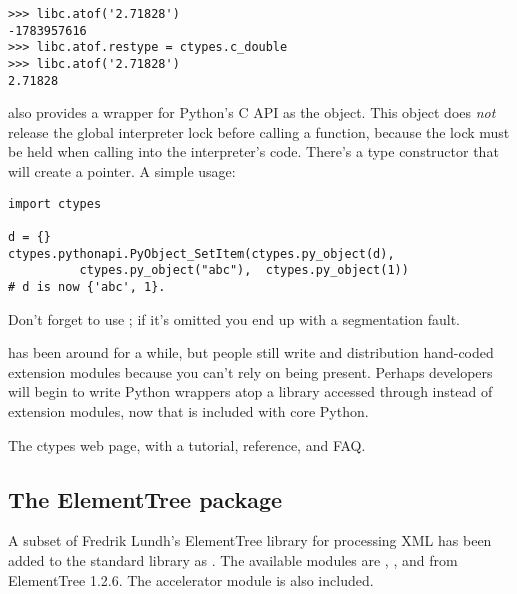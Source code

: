 \documentclass{howto}
\begin{document}
\begin{verbatim}
>>> libc.atof('2.71828')
-1783957616
>>> libc.atof.restype = ctypes.c_double
>>> libc.atof('2.71828')
2.71828
\end{verbatim}

 also provides a wrapper for Python's C API 
as the  object.  This object does \emph{not} 
release the global interpreter lock before calling a function, because the lock must be held when calling into the interpreter's code.  
There's a  type constructor that will create a 
 pointer.  A simple usage:

\begin{verbatim}
import ctypes

d = {}
ctypes.pythonapi.PyObject_SetItem(ctypes.py_object(d),
          ctypes.py_object("abc"),  ctypes.py_object(1))
# d is now {'abc', 1}.
\end{verbatim}

Don't forget to use ; if it's omitted you end 
up with a segmentation fault.

 has been around for a while, but people still write 
and distribution hand-coded extension modules because you can't rely on  being present.
Perhaps developers will begin to write 
Python wrappers atop a library accessed through  instead
of extension modules, now that  is included with core Python.

\begin{seealso}

{The ctypes web page, with a tutorial, reference, and FAQ.}


\end{seealso}


\subsection{The ElementTree package\label{module-etree}}

A subset of Fredrik Lundh's ElementTree library for processing XML has
been added to the standard library as .  The
available modules are
, , and
 from ElementTree 1.2.6.   
The  accelerator module is also included. 
\end{document}
